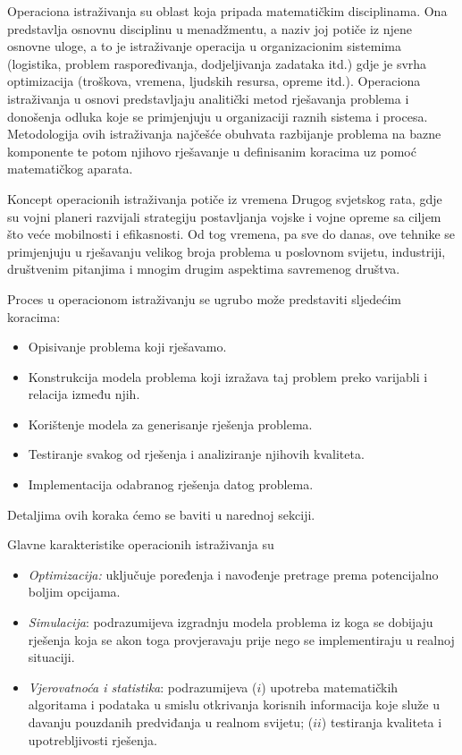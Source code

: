 \documentclass[a4paper, utf8, 11pt, colorlinks]{book}
\begin{document}
Operaciona istraživanja su oblast koja pripada matematičkim disciplinama. Ona predstavlja osnovnu disciplinu u menadžmentu, a naziv joj potiče iz njene osnovne uloge, a to je istraživanje  operacija u organizacionim sistemima (logistika, problem raspoređivanja, dodjeljivanja zadataka itd.) gdje je svrha optimizacija (troškova, vremena, ljudskih resursa, opreme itd.). Operaciona istraživanja u osnovi predstavljaju analitički metod rješavanja problema i donošenja odluka koje se primjenjuju u organizaciji raznih sistema i procesa. Metodologija ovih istraživanja  najčešće obuhvata razbijanje problema na bazne komponente te potom njihovo rješavanje u definisanim koracima uz pomoć matematičkog aparata. 

Koncept operacionih istraživanja potiče iz vremena Drugog svjetskog rata, gdje su vojni planeri razvijali strategiju postavljanja vojske i vojne opreme sa ciljem što veće mobilnosti i efikasnosti. Od tog vremena, pa sve do danas, ove tehnike se primjenjuju u rješavanju velikog broja problema u poslovnom svijetu, industriji, društvenim pitanjima i mnogim drugim aspektima savremenog društva. 

Proces u operacionom istraživanju se ugrubo može predstaviti sljedećim koracima:
\begin{itemize}
    \item Opisivanje problema koji rješavamo.
    \item Konstrukcija modela problema koji izražava taj problem preko varijabli i relacija između njih. 
    \item Korištenje modela za generisanje rješenja problema.
    \item Testiranje svakog od rješenja i analiziranje njihovih  kvaliteta.
    \item Implementacija odabranog rješenja datog problema. 
\end{itemize}
Detaljima ovih koraka ćemo se baviti  u narednoj sekciji.
 
Glavne karakteristike operacionih istraživanja su
\begin{itemize}
    \item \emph{Optimizacija:} %
     uključuje poređenja i navođenje pretrage prema potencijalno boljim opcijama.
    \item \emph{Simulacija}:  podrazumijeva izgradnju modela problema iz koga se dobijaju rješenja koja se akon toga provjeravaju prije nego se implementiraju u realnoj situaciji.
    \item \emph{Vjerovatnoća i statistika}:  podrazumijeva ($i$) upotreba matematičkih algoritama i podataka u smislu otkrivanja korisnih informacija koje služe u davanju pouzdanih predviđanja u realnom svijetu; ($ii$) testiranja kvaliteta i upotrebljivosti rješenja.
\end{itemize}
 
\end{document}
